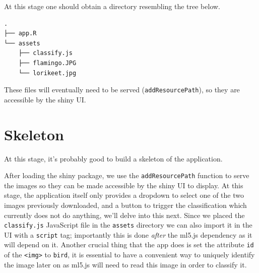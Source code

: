 \documentclass[10pt,]{krantz}
\begin{document}
At this stage one should obtain a directory resembling the tree below.

\begin{verbatim}
.
├── app.R
└── assets
    ├── classify.js
    ├── flamingo.JPG
    └── lorikeet.jpg
\end{verbatim}

These files will eventually need to be served (\texttt{addResourcePath}), so they are accessible by the shiny UI.

\hypertarget{shiny-complete-skeleton}{%
\section{Skeleton}\label{shiny-complete-skeleton}}

At this stage, it's probably good to build a skeleton of the application.

After loading the shiny package, we use the \texttt{addResourcePath} function to serve the images so they can be made accessible by the shiny UI to display. At this stage, the application itself only provides a dropdown to select one of the two images previously downloaded, and a button to trigger the classification which currently does not do anything, we'll delve into this next. Since we placed the \texttt{classify.js} JavaScript file in the \texttt{assets} directory we can also import it in the UI with a \texttt{script} tag; importantly this is done \emph{after} the ml5.js dependency as it will depend on it. Another crucial thing that the app does is set the attribute \texttt{id} of the \texttt{\textless{}img\textgreater{}} to \texttt{bird}, it is essential to have a convenient way to uniquely identify the image later on as ml5.js will need to read this image in order to classify it.
\end{document}
